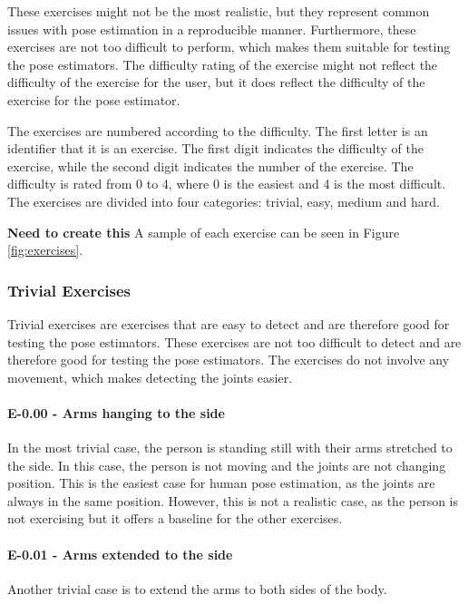 These exercises might not be the most realistic, but they represent common issues with pose estimation in a reproducible manner. Furthermore, these exercises are not too difficult to perform, which makes them suitable for testing the pose estimators. The difficulty rating of the exercise might not reflect the difficulty of the exercise for the user, but it does reflect the difficulty of the exercise for the pose estimator.

The exercises are numbered according to the difficulty. The first letter is an identifier that it is an exercise. The first digit indicates the difficulty of the exercise, while the second digit indicates the number of the exercise. The difficulty is rated from 0 to 4, where 0 is the easiest and 4 is the most difficult. The exercises are divided into four categories: trivial, easy, medium and hard.

\textbf{Need to create this}
A sample of each exercise can be seen in Figure \ref{fig:exercises}.


\subsubsection{Trivial Exercises}

Trivial exercises are exercises that are easy to detect and are therefore good for testing the pose estimators. These exercises are not too difficult to detect and are therefore good for testing the pose estimators. The exercises do not involve any movement, which makes detecting the joints easier. 

\paragraph{E-0.00 - Arms hanging to the side}

In the most trivial case, the person is standing still with their arms stretched to the side. In this case, the person is not moving and the joints are not changing position. This is the easiest case for human pose estimation, as the joints are always in the same position. However, this is not a realistic case, as the person is not exercising but it offers a baseline for the other exercises.

\paragraph{E-0.01 - Arms extended to the side}

Another trivial case is to extend the arms to both sides of the body.  

